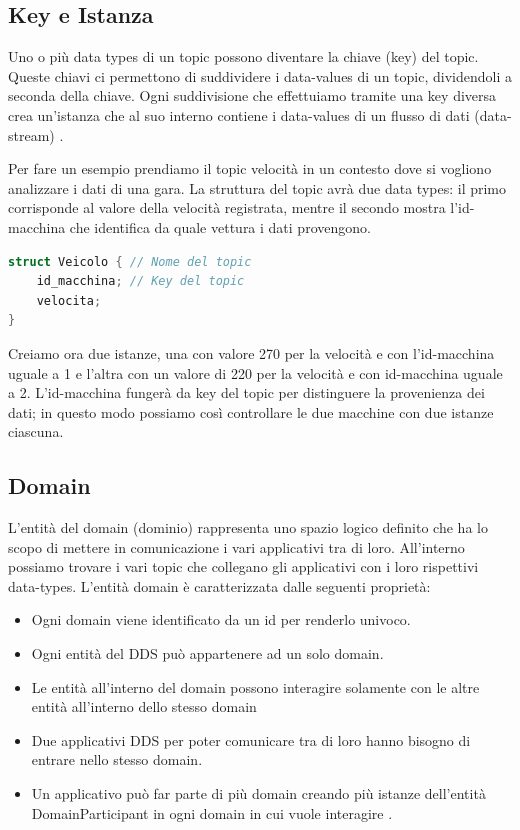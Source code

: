 \subsection{Key e Istanza}
Uno o più data types di un topic possono diventare la chiave (key) del topic. 
Queste chiavi ci permettono di suddividere
i data-values di un topic, dividendoli a seconda della chiave.
Ogni suddivisione che effettuiamo tramite una key diversa crea 
un'istanza che al suo interno contiene i data-values di un 
flusso di dati (data-stream)
\cite{Instance81:online}.

Per fare un esempio prendiamo il topic velocità in un contesto dove si
vogliono analizzare i dati di una gara.
La struttura del topic avrà due data types: il primo corrisponde al valore
della velocità registrata, mentre il secondo mostra l'id-macchina 
che identifica da quale vettura i dati provengono.

\vspace{5mm} %
\begin{lstlisting}[language=C++, caption=Esempio di Topic con una key
    usando il linguaggio IDL.
    , label=topic struct,
    captionpos=b]
struct Veicolo { // Nome del topic
    id_macchina; // Key del topic
    velocita;
}
\end{lstlisting}
\vspace{5mm}

Creiamo ora due istanze, una con valore 270 per la velocità e con 
l'id-macchina uguale a 1 e l'altra con un valore di 220 per la velocità e 
con id-macchina 
uguale a 2. L'id-macchina fungerà da key 
del topic per distinguere la provenienza dei dati; in questo
modo possiamo così controllare le due macchine con due istanze ciascuna.



\subsection{Domain}
L'entità del domain (dominio) rappresenta uno spazio logico definito che
ha lo scopo di mettere in comunicazione i vari applicativi tra di loro.
All'interno possiamo trovare i vari topic che collegano gli applicativi
con i loro rispettivi data-types.
L'entità domain è caratterizzata dalle seguenti proprietà:
\begin{itemize}
    \item Ogni domain viene identificato da un id 
    per renderlo univoco.
    \item Ogni entità del DDS può appartenere
    ad un solo domain.
    \item Le entità all'interno del domain possono interagire
    solamente con le altre entità all'interno dello stesso domain
    \item Due applicativi DDS per poter comunicare tra di loro
    hanno bisogno di entrare nello stesso domain.
    \item Un applicativo può far parte di più domain creando 
    più istanze dell'entità DomainParticipant in ogni
    domain in cui vuole interagire \cite{domainrti}.
\end{itemize}

